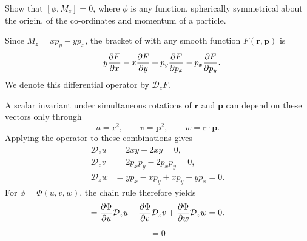 
\begin{problem}[title={Bracket of a spherically symmetric \texorplain{$\phi$}{φ} with \texorplain{$M_z$}{M\_z}}]
{
Show that $[\phi, M_z] = 0$, where $\phi$ is any function, spherically symmetrical about the origin, of the co-ordinates and momentum of a particle.
}
{
Since $M_z = xp_y - yp_x$, the bracket of  with any smooth function $F(\mathbf{r}, \mathbf{p})$ is
\begin{equation*}
    [F, M_z] = y\pd{F}{x} - x\pd{F}{y} + p_y\pd{F}{p_x} - p_x\pd{F}{p_y}.
\end{equation*}
We denote this differential operator by $\mathcal{D}_zF$.

A scalar invariant under simultaneous rotations of $\mathbf{r}$ and $\mathbf{p}$ can depend on these vectors only through
\begin{equation*}
    u = \mathbf{r}^2, \qquad v = \mathbf{p}^2, \qquad w = \mathbf{r}\cdot\mathbf{p}.
\end{equation*}
Applying the operator to these combinations gives
\begin{align*}
    \mathcal{D}_zu &= 2xy - 2xy = 0, \\
    \mathcal{D}_zv &= 2p_xp_y - 2p_xp_y = 0, \\
    \mathcal{D}_zw &= yp_x - xp_y + xp_y - yp_x = 0.
\end{align*}
For $\phi = \Phi(u, v, w)$, the chain rule therefore yields
\begin{equation*}
    [\phi, M_z] = \pd{\Phi}{u}\mathcal{D}_zu + \pd{\Phi}{v}\mathcal{D}_zv + \pd{\Phi}{w}\mathcal{D}_zw = 0.
\end{equation*}
}
{
\begin{equation*}
    [\phi, M_z] = 0
\end{equation*}
}
\end{problem}


